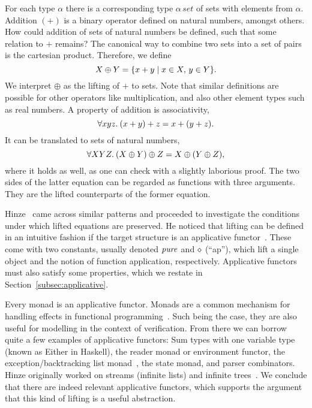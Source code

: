 \begin{example}\label{exmp:set-intro}
For each type $\alpha$ there is a corresponding type $\alpha\,\mathit{set}$
of sets with elements from $\alpha$.
Addition $(+)$ is a binary operator defined on natural numbers, amongst others.
How could addition of sets of natural numbers be defined, such that some
relation to $+$ remains?
The canonical way to combine two sets into a set of pairs is the cartesian
product.
Therefore, we define
\begin{equation}\label{eq:set-plus-exp}
	X \oplus Y = \{x + y\mid x \in X,\, y \in Y\}.
\end{equation}
We interpret $\oplus$ as the lifting of $+$ to sets.
Note that similar definitions are possible for other operators like
multiplication, and also other element types such as real numbers.
A property of addition is associativity,
\begin{equation}\label{eq:plus-assoc}
	\forall x y z.\>(x + y) + z = x + (y + z).
\end{equation}
It can be translated to sets of natural numbers,
\begin{equation}\label{eq:set-plus-assoc}
	\forall X Y Z.\>(X \oplus Y) \oplus Z = X \oplus (Y \oplus Z),
\end{equation}
where it holds as well, as one can check with a slightly laborious proof.
The two sides of the latter equation can be regarded as functions with three
arguments.
They are the lifted counterparts of the former equation.
\end{example}

Hinze~\cite{hinze10} came across similar patterns and proceeded to investigate
the conditions under which lifted equations are preserved.
He noticed that lifting can be defined in an intuitive fashion if the target
structure is an applicative functor~\cite{mcbride08}.
These come with two constants, usually denoted $\operatorname{\mathit{pure}}$ and $\diamond$ (``ap''),
which lift a single object and the notion of function application, respectively.
Applicative functors must also satisfy some properties, which we restate in
Section~\ref{subsec:applicative}.

Every monad is an applicative functor.
Monads are a common mechanism for handling effects in functional
programming~\cite{wadler95}.
Such being the case, they are also useful for modelling in the context of
verification.
From there we can borrow quite a few examples of applicative functors:
Sum types with one variable type (known as \textsf{Either} in Haskell),
the reader monad or environment functor, the exception/backtracking list
monad~\cite{wadler85}, the state monad, and parser combinators.
Hinze originally worked on streams (infinite lists) and infinite
trees~\cite{hinze08,hinze09}.
We conclude that there are indeed relevant applicative functors, which supports
the argument that this kind of lifting is a useful abstraction.

